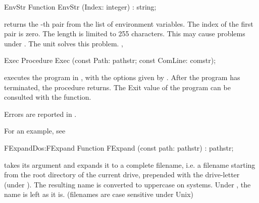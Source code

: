 \begin{function}{EnvStr}
\Declaration
Function EnvStr (Index: integer) : string;\Description

 returns the -th  pair from the list
of environment variables. 
The index of the first pair is zero.
\Errors
The length is limited to 255 characters. This may cause problems under
\linux. The \linux unit solves this problem.
\SeeAlso
{}, 
\end{function}


\begin{procedure}{Exec}
\Declaration
Procedure Exec (const Path: pathstr; const ComLine: comstr);
\Description

 executes the program in , with the options given by
.
After the program has terminated, the procedure returns. The Exit value of
the program can be consulted with the  function.

\Errors
Errors are reported in .
\SeeAlso
{}
\end{procedure}
For an example, see 
\begin{functionl}{FExpand}{Dos:FExpand}
\Declaration
Function FExpand (const path: pathstr) : pathstr;
\Description

 takes its argument and expands it to a complete filename, i.e.
a filename starting from the root directory of the current drive, prepended
with the drive-letter (under \dos).
The resulting name is converted to uppercase on \dos systems. Under \linux,
the name is left as it is. (filenames are case sensitive under Unix)

\Errors
{}
\SeeAlso

\end{functionl}

